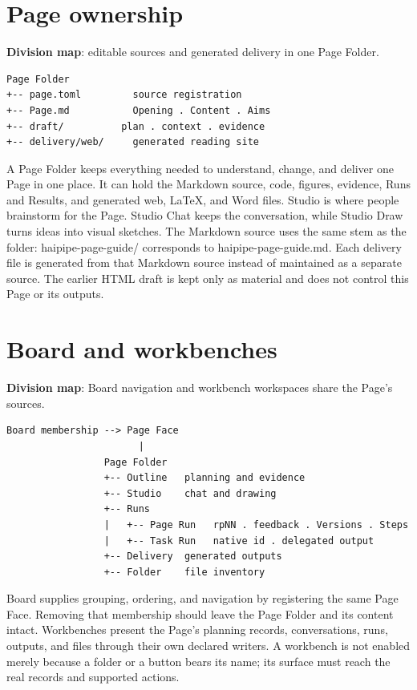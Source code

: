 
\section{Page ownership}
\textbf{Division map}: editable sources and generated delivery in one Page Folder.

\begin{verbatim}
Page Folder
+-- page.toml         source registration
+-- Page.md           Opening . Content . Aims
+-- draft/          plan . context . evidence
+-- delivery/web/     generated reading site
\end{verbatim}
A Page Folder keeps everything needed to understand, change, and deliver one Page in one place. It can hold the Markdown source, code, figures, evidence, Runs and Results, and generated web, LaTeX, and Word files. Studio is where people brainstorm for the Page. Studio Chat keeps the conversation, while Studio Draw turns ideas into visual sketches. The Markdown source uses the same stem as the folder: haipipe-page-guide/ corresponds to haipipe-page-guide.md. Each delivery file is generated from that Markdown source instead of maintained as a separate source. The earlier HTML draft is kept only as material and does not control this Page or its outputs.


\section{Board and workbenches}
\textbf{Division map}: Board navigation and workbench workspaces share the Page's sources.

\begin{verbatim}
Board membership --> Page Face
                       |
                 Page Folder
                 +-- Outline   planning and evidence
                 +-- Studio    chat and drawing
                 +-- Runs
                 |   +-- Page Run   rpNN . feedback . Versions . Steps
                 |   +-- Task Run   native id . delegated output
                 +-- Delivery  generated outputs
                 +-- Folder    file inventory
\end{verbatim}
Board supplies grouping, ordering, and navigation by registering the same Page Face. Removing that membership should leave the Page Folder and its content intact. Workbenches present the Page's planning records, conversations, runs, outputs, and files through their own declared writers. A workbench is not enabled merely because a folder or a button bears its name; its surface must reach the real records and supported actions.

